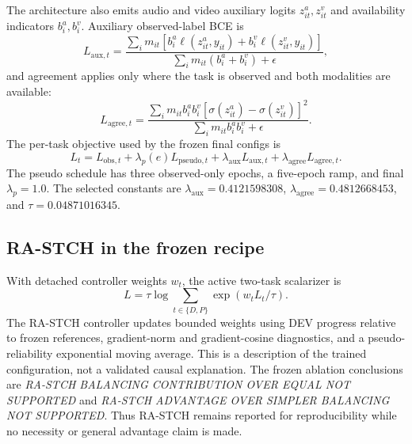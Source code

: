 The architecture also emits audio and video auxiliary logits $z^a_{it},z^v_{it}$ and availability indicators $b^a_i,b^v_i$. Auxiliary observed-label BCE is
\begin{equation}
 L_{\mathrm{aux},t} =
 \frac{\sum_i m_{it}\left[b_i^a\ell(z^a_{it},y_{it})+
 b_i^v\ell(z^v_{it},y_{it})\right]}
 {\sum_i m_{it}(b_i^a+b_i^v)+\epsilon},
 \label{eq:aux}
\end{equation}
and agreement applies only where the task is observed and both modalities are available:
\begin{equation}
 L_{\mathrm{agree},t}=
 \frac{\sum_i m_{it}b_i^ab_i^v
 [\sigma(z^a_{it})-\sigma(z^v_{it})]^2}
 {\sum_i m_{it}b_i^ab_i^v+\epsilon}.
 \label{eq:agree}
\end{equation}
The per-task objective used by the frozen final configs is
\begin{equation}
 L_t=L_{\mathrm{obs},t}+\lambda_p(e)L_{\mathrm{pseudo},t}
 +\lambda_{\mathrm{aux}}L_{\mathrm{aux},t}
 +\lambda_{\mathrm{agree}}L_{\mathrm{agree},t}.
 \label{eq:taskloss}
\end{equation}
The pseudo schedule has three observed-only epochs, a five-epoch ramp, and final $\lambda_p=1.0$. The selected constants are $\lambda_{\mathrm{aux}}=0.4121598308$, $\lambda_{\mathrm{agree}}=0.4812668453$, and $\tau=0.04871016345$.

\subsection{RA-STCH in the frozen recipe}

With detached controller weights $w_t$, the active two-task scalarizer is
\begin{equation}
 L=\tau\log\sum_{t\in\{D,P\}}\exp(w_tL_t/\tau).
 \label{eq:stch}
\end{equation}
The RA-STCH controller updates bounded weights using DEV progress relative to frozen references, gradient-norm and gradient-cosine diagnostics, and a pseudo-reliability exponential moving average. This is a description of the trained configuration, not a validated causal explanation. The frozen ablation conclusions are \emph{RA-STCH BALANCING CONTRIBUTION OVER EQUAL NOT SUPPORTED} and \emph{RA-STCH ADVANTAGE OVER SIMPLER BALANCING NOT SUPPORTED}. Thus RA-STCH remains reported for reproducibility while no necessity or general advantage claim is made.
\clearpage

